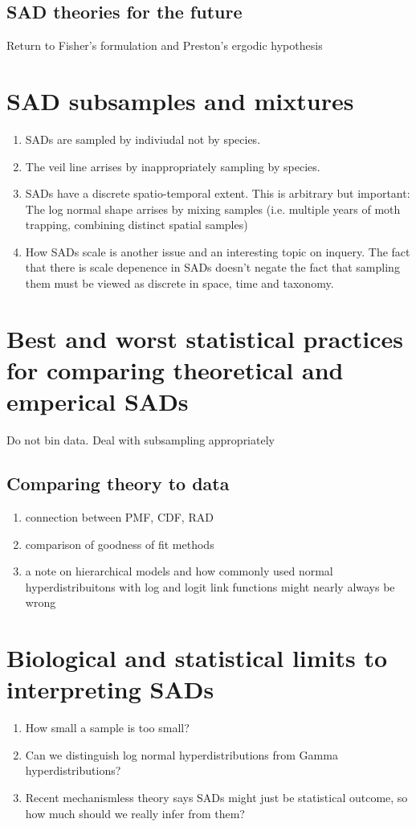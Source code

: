 \documentclass[12pt]{article}
\begin{document}
\subsection{SAD theories for the future}
Return to Fisher's formulation and Preston's ergodic hypothesis


\section{SAD subsamples and mixtures}

\begin{enumerate}
\item SADs are sampled by indiviudal not by species. 
\item The veil line arrises by inappropriately sampling by species.
\item SADs have a discrete spatio-temporal extent. This is arbitrary but
important: The log normal shape arrises by mixing samples
(i.e. multiple years of moth trapping, combining distinct spatial
samples)
\item How SADs scale is another issue and an interesting topic on inquery.
The fact that there is scale depenence in SADs doesn't negate the fact
that sampling them must be viewed as discrete in space, time and
taxonomy.
\end{enumerate}


\section{Best and worst statistical practices for comparing
  theoretical and emperical SADs}

Do not bin data. Deal with subsampling appropriately

\subsection{Comparing theory to data}
\begin{enumerate}
\item connection between PMF, CDF, RAD
\item comparison of goodness of fit methods
\item a note on hierarchical models and how commonly used normal
  hyperdistribuitons with log and logit link functions might nearly
  always be wrong
\end{enumerate}

\section{Biological and statistical limits to interpreting SADs}
\begin{enumerate}
\item How small a sample is too small?
\item Can we distinguish log normal hyperdistributions from Gamma
hyperdistributions?
\item Recent mechanismless theory says SADs might just be statistical
outcome, so how much should we really infer from them?
\end{enumerate}
\end{document}
